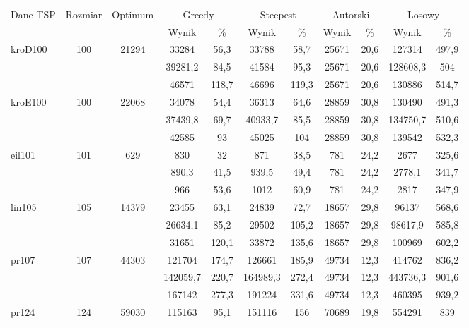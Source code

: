 \begin{adjustwidth}{-1in}{-1in}
\begin{center}
\begin{tabular}{lcccccccccc}
\toprule
 \multirow{2}{*}{Dane TSP} & \multirow{2}{*}{Rozmiar} & \multirow{2}{*}{Optimum} & \multicolumn{2}{c}{Greedy} & \multicolumn{2}{c}{Steepest} & \multicolumn{2}{c}{Autorski} & \multicolumn{2}{c}{Losowy} \\
 & & & Wynik & \% & Wynik & \% & Wynik & \% & Wynik & \% \\
\toprule
\multirow{3}{*}{kroD100} & \multirow{3}{*}{100} & \multirow{3}{*}{21294} & 33284 & 56,3  & 33788 & 58,7  & 25671 & 20,6  & 127314 & 497,9 \\
 & &  & 39281,2 & 84,5  & 41584 & 95,3  & 25671 & 20,6  & 128608,3 & 504 \\
 & &  & 46571 & 118,7  & 46696 & 119,3  & 25671 & 20,6  & 130886 & 514,7 \\
\midrule
\multirow{3}{*}{kroE100} & \multirow{3}{*}{100} & \multirow{3}{*}{22068} & 34078 & 54,4  & 36313 & 64,6  & 28859 & 30,8  & 130490 & 491,3 \\
 & &  & 37439,8 & 69,7  & 40933,7 & 85,5  & 28859 & 30,8  & 134750,7 & 510,6 \\
 & &  & 42585 & 93  & 45025 & 104  & 28859 & 30,8  & 139542 & 532,3 \\
\midrule
\multirow{3}{*}{eil101} & \multirow{3}{*}{101} & \multirow{3}{*}{629} & 830 & 32  & 871 & 38,5  & 781 & 24,2  & 2677 & 325,6 \\
 & &  & 890,3 & 41,5  & 939,5 & 49,4  & 781 & 24,2  & 2778,1 & 341,7 \\
 & &  & 966 & 53,6  & 1012 & 60,9  & 781 & 24,2  & 2817 & 347,9 \\
\midrule
\multirow{3}{*}{lin105} & \multirow{3}{*}{105} & \multirow{3}{*}{14379} & 23455 & 63,1  & 24839 & 72,7  & 18657 & 29,8  & 96137 & 568,6 \\
 & &  & 26634,1 & 85,2  & 29502 & 105,2  & 18657 & 29,8  & 98617,9 & 585,8 \\
 & &  & 31651 & 120,1  & 33872 & 135,6  & 18657 & 29,8  & 100969 & 602,2 \\
\midrule
\multirow{3}{*}{pr107} & \multirow{3}{*}{107} & \multirow{3}{*}{44303} & 121704 & 174,7  & 126661 & 185,9  & 49734 & 12,3  & 414762 & 836,2 \\
 & &  & 142059,7 & 220,7  & 164989,3 & 272,4  & 49734 & 12,3  & 443736,3 & 901,6 \\
 & &  & 167142 & 277,3  & 191224 & 331,6  & 49734 & 12,3  & 460395 & 939,2 \\
\midrule
\multirow{3}{*}{pr124} & \multirow{3}{*}{124} & \multirow{3}{*}{59030} & 115163 & 95,1  & 151116 & 156  & 70689 & 19,8  & 554291 & 839 \\

\end{tabular}
\end{center}
\end{adjustwidth}
